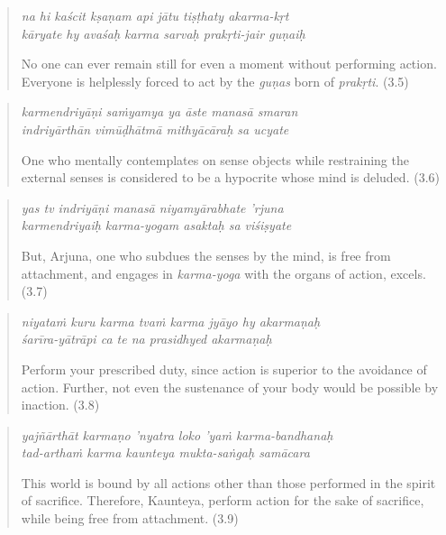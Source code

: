 \documentclass[12pt, twoside, openright]{memoir}
\begin{document}
\par
\begin{verse}
\textit{na hi kaścit kṣaṇam api jātu tiṣṭhaty akarma-kṛt} \\
\textit{kāryate hy avaśaḥ karma sarvaḥ prakṛti-jair guṇaiḥ}

\noindent No one can ever remain still for even a moment without performing action. Everyone is helplessly forced to act by the \textit{guṇas} born of \textit{prakṛti}. (3.5)
\end{verse}
\par



\par
\begin{verse}
\textit{karmendriyāṇi saṁyamya ya āste manasā smaran} \\
\textit{indriyārthān vimūḍhātmā mithyācāraḥ sa ucyate}

\noindent One who mentally contemplates on sense objects while restraining the external senses is considered to be a hypocrite whose mind is deluded. (3.6)
\end{verse}
\par



\par
\begin{verse}
\textit{yas tv indriyāṇi manasā niyamyārabhate ’rjuna} \\
\textit{karmendriyaiḥ karma-yogam asaktaḥ sa viśiṣyate}

\noindent But, Arjuna, one who subdues the senses by the mind, is free from attachment, and engages in \textit{karma-yoga} with the organs of action, excels. (3.7)
\end{verse}
\par



\par
\begin{verse}
\textit{niyataṁ kuru karma tvaṁ karma jyāyo hy akarmaṇaḥ} \\
\textit{śarīra-yātrāpi ca te na prasidhyed akarmaṇaḥ}

\noindent Perform your prescribed duty, since action is superior to the avoidance of action. Further, not even the sustenance of your body would be possible by inaction. (3.8)
\end{verse}
\par



\par
\begin{verse}
\textit{yajñārthāt karmaṇo ’nyatra loko ’yaṁ karma-bandhanaḥ} \\
\textit{tad-arthaṁ karma kaunteya mukta-saṅgaḥ samācara}

\noindent This world is bound by all actions other than those performed in the spirit of sacrifice. Therefore, Kaunteya, perform action for the sake of sacrifice, while being free from attachment. (3.9)
\end{verse}
\par
\end{document}
